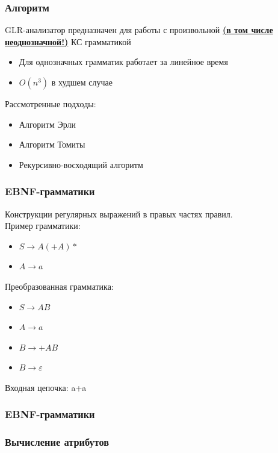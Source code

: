 \documentclass{beamer}
\begin{document}
\begin{frame}
	\transwipe[direction=90]
	\frametitle{Алгоритм}
	 GLR-анализатор предназначен для работы с произвольной {\bfseries{\underline {(в том числе неоднозначной!)}}} КС  грамматикой
	\begin{itemize}
		\item Для однозначных грамматик работает за линейное время
    \item {$O(n^{3})$ в худшем случае}
	\end{itemize}
	Рассмотренные подходы:
	\begin{itemize}
			\item Алгоритм Эрли				
			\item Алгоритм Томиты				
			\item Рекурсивно-восходящий алгоритм				
	\end{itemize}					
\end{frame}

\begin{frame}
	\transwipe[direction=90]
	\frametitle{EBNF-грамматики}
	Конструкции регулярных выражений в правых частях правил.
  \\
	Пример грамматики: 
		\begin{itemize}
			\item $S \rightarrow A(+A)*$
			\item $A \rightarrow a$
		\end{itemize}
	Преобразованная грамматика:
  \begin{itemize}
		\item $S \rightarrow AB$
		\item $A \rightarrow a$
		\item $B \rightarrow +AB$		
		\item $B \rightarrow \varepsilon$
	\end{itemize}
	Входная цепочка: a+a

\end{frame}

\begin{frame}[t]
	\transwipe[direction=90]
	\frametitle{EBNF-грамматики}
  
   
\end{frame}

\begin{frame}
	\transwipe[direction=90]
	\frametitle{Вычисление атрибутов}
  
  
\end{frame}
\end{document}
